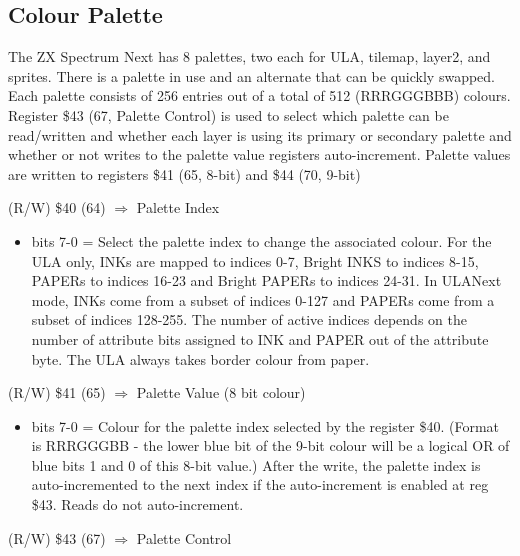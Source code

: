 \subsection{Colour Palette}

The ZX Spectrum Next has 8 palettes, two each for ULA, tilemap,
layer2, and sprites.  There is a palette in use and an alternate that
can be quickly swapped.  Each palette consists of 256 entries out of a
total of 512 (RRRGGGBBB) colours.  Register \$43 (67, Palette Control)
is used to select which palette can be read/written and whether each
layer is using its primary or secondary palette and whether or not
writes to the palette value registers auto-increment. Palette values
are written to registers \$41 (65, 8-bit) and \$44 (70, 9-bit)

(R/W) \$40 (64) $\Rightarrow$ Palette Index
\begin{itemize}
\item bits 7-0 = Select the palette index to change the associated colour.
For the ULA only, INKs are mapped to indices 0-7, Bright INKS to
indices 8-15, PAPERs to indices 16-23 and Bright PAPERs to indices
24-31.  In ULANext mode, INKs come from a subset of indices 0-127 and
PAPERs come from a subset of indices 128-255.  The number of active
indices depends on the number of attribute bits assigned to INK and
PAPER out of the attribute byte.  The ULA always takes border colour
from paper.
\end{itemize}
(R/W) \$41 (65) $\Rightarrow$ Palette Value (8 bit colour)
\begin{itemize}
\item bits 7-0 = Colour for the palette index selected by the register \$40.
(Format is RRRGGGBB - the lower blue bit of the 9-bit colour will be a
logical OR of blue bits 1 and 0 of this 8-bit value.)  After the
write, the palette index is auto-incremented to the next index if the
auto-increment is enabled at reg \$43.  Reads do not auto-increment.
\end{itemize}
(R/W) \$43 (67) $\Rightarrow$ Palette Control
